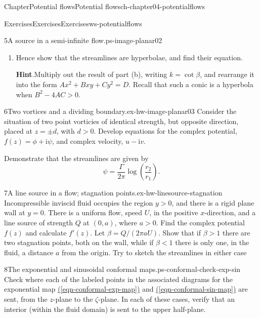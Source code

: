 \documentclass[oneside,10pt,]{book}
\newcommand{\blocktitlefont}{\relax}
\newcommand{\xreffont}{\relax}
\numberwithin{equation}{section}
\newcommand{\e}{\mathrm{e}}
\newcommand{\im}{\mathrm{i}}
\newcommand{\gt}{>}
\begin{document}
\begin{chapterptx}{Chapter}{Potential flows}{}{Potential flows}{}{}{ch-chapter04-potentialflows}
\begin{exercises-section}{Exercises}{Exercises}{}{Exercises}{}{}{ws-potentialflows}
\begin{exercisegroup}
\begin{divisionexerciseeg}{5}{A source in a semi-infinite flow.}{}{ps-image-planar02}
\begin{enumerate}[font=\bfseries,label=(\alph*),ref=\alph*]
\par
Finally, recall that any complex number can be written as \(w = a + \im b = |w|\e^{\im\beta}\), where \(\beta = \operatorname{Arg} w\). Comparing real and imaginary parts gives \(a = |w|\cos\beta\) and \(b = |w|\sin\beta\), so that \(b/a = \tan\beta\).%
\item{}Hence show that the streamlines are hyperbolae, and find their equation.%
\par\smallskip%
\noindent\textbf{\blocktitlefont Hint}.\hypertarget{ps-image-planar02-5-2}{}\quad{}Multiply out the result of part (b), writing \(k = \cot\beta\), and rearrange it into the form \(Ax^2 + Bxy + Cy^2 = D\). Recall that such a conic is a hyperbola when \(B^2 - 4AC \gt 0\).%
\end{enumerate}%
\end{divisionexerciseeg}%
\begin{divisionexerciseeg}{6}{Two vortices and a dividing boundary.}{}{ex-hw-image-planar03}%
Consider the situation of two point vorticies of identical strength, but opposite direction, placed at \(z = \pm d\), with \(d \gt 0\). Develop equations for the complex potential, \(f(z) = \phi + \im \psi\), and complex velocity, \(u - \im v\).%
\par
Demonstrate that the streamlines are given by%
\begin{equation*}
\psi = \frac{\Gamma}{2\pi}\log \left( \frac{r_2}{r_1}\right).
\end{equation*}
%
\end{divisionexerciseeg}%
\begin{divisionexerciseeg}{7}{A line source in a flow; stagnation points.}{}{ex-hw-linesource-stagnation}%
Incompressible inviscid fluid occupies the region \(y > 0\), and there is a rigid plane wall at \(y = 0\). There is a uniform flow, speed \(U\), in the positive \(x\)-direction, and a line source of strength \(Q\) at \((0, a)\), where \(a > 0\). Find the complex potential \(f(z)\) and calculate \(f'(z)\). Let \(\beta = Q/(2\pi aU)\). Show that if \(\beta > 1\) there are two stagnation points, both on the wall, while if \(\beta < 1\) there is only one, in the fluid, a distance \(a\) from the origin. Try to sketch the streamlines in either case%
\end{divisionexerciseeg}%
\begin{divisionexerciseeg}{8}{The exponential and sinusoidal conformal maps.}{}{ps-conformal-check-exp-sin}%
Check where each of the labeled points in the associated diagrams for the exponential map \hyperref[eqn-conformal-exp-map]{({\xreffont\ref{eqn-conformal-exp-map}})} and \hyperref[eqn-conformal-sin-map]{({\xreffont\ref{eqn-conformal-sin-map}})} are sent, from the \(z\)-plane to the \(\zeta\)-plane. In each of these cases, verify that an interior (within the fluid domain) is sent to the upper half-plane.%

\end{divisionexerciseeg}
\end{exercisegroup}
\end{exercises-section}
\end{chapterptx}
\end{document}
